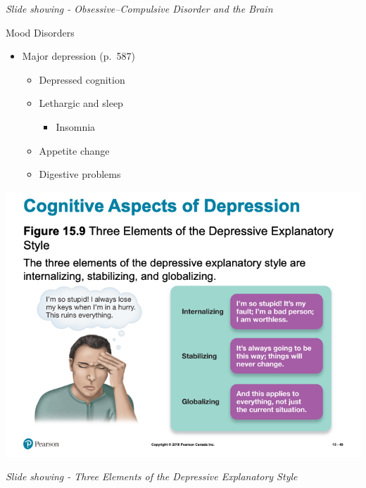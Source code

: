\documentclass[
]{book}
\providecommand{\tightlist}{%
  \setlength{\itemsep}{0pt}\setlength{\parskip}{0pt}}
\begin{document}
\begin{reflect}
\emph{Slide showing - Obsessive--Compulsive Disorder and the Brain}

Mood Disorders

\begin{itemize}
\tightlist
\item
  Major depression (p.~587)

  \begin{itemize}
  \tightlist
  \item
    Depressed cognition\\
  \item
    Lethargic and sleep

    \begin{itemize}
    \tightlist
    \item
      Insomnia\\
    \end{itemize}
  \item
    Appetite change\\
  \item
    Digestive problems
  \end{itemize}
\end{itemize}

\includegraphics{assets/unit_10/slide_49.png}

\emph{Slide showing - Three Elements of the Depressive Explanatory Style}


\end{reflect}
\end{document}

